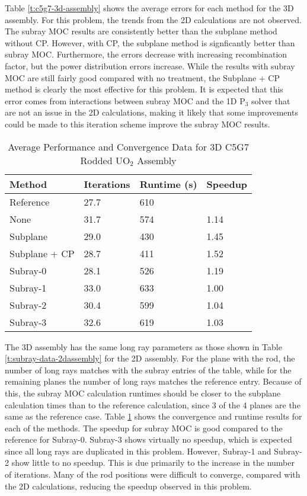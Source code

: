 Table \ref{t:c5g7-3d-assembly} shows the average errors for each method for the 3D assembly.  For this problem, the trends from the 2D calculations are not observed.  The subray MOC results are consistently better than the subplane method without CP.  However, with CP, the subplane method is signficantly better than subray MOC.  Furthermore, the \keff{} errors decrease with increasing recombination factor, but the power distribution errors increase.  While the results with subray MOC are still fairly good compared with no treatment, the Subplane + CP method is clearly the most effective for this problem.  It is expected that this error comes from interactions between subray MOC and the 1D P$_3$ solver that are not an issue in the 2D calculations, making it likely that some improvements could be made to this iteration scheme improve the subray MOC results.

\begin{table}[h]
    \centering
    \caption[3D C5G7 UO$_2$ Assembly Performance]{Average Performance and Convergence Data for 3D C5G7 Rodded UO$_2$ Assembly}\label{t:subray-performance-3Dassembly}
    \begin{tabular}{l l l l}\toprule
        Method & Iterations & Runtime (s) & Speedup \\\midrule
Reference     & 27.7 & 610 &      \\
None          & 31.7 & 574 & 1.14 \\
Subplane      & 29.0 & 430 & 1.45 \\
Subplane + CP & 28.7 & 411 & 1.52 \\
Subray-0      & 28.1 & 526 & 1.19 \\
Subray-1      & 33.0 & 633 & 1.00 \\
Subray-2      & 30.4 & 599 & 1.04 \\
Subray-3      & 32.6 & 619 & 1.03 \\
        \bottomrule
    \end{tabular}
\end{table}

The 3D assembly has the same long ray parameters as those shown in Table \ref{t:subray-data-2dassembly} for the 2D assembly.  For the plane with the rod, the number of long rays matches with the subray entries of the table, while for the remaining planes the number of long rays matches the reference entry.  Because of this, the subray MOC calculation runtimes should be closer to the subplane calculation times than to the reference calculation, since 3 of the 4 planes are the same as the reference case.  Table \ref{t:subray-performance-3Dassembly} shows the convergence and runtime results for each of the methods.  The speedup for subray MOC is good compared to the reference for Subray-0.  Subray-3 shows virtually no speedup, which is expected since all long rays are duplicated in this problem.  However, Subray-1 and Subray-2 show little to no speedup.  This is due primarily to the increase in the number of iterations.  Many of the rod positions were difficult to converge, compared with the 2D calculations, reducing the speedup observed in this problem.
